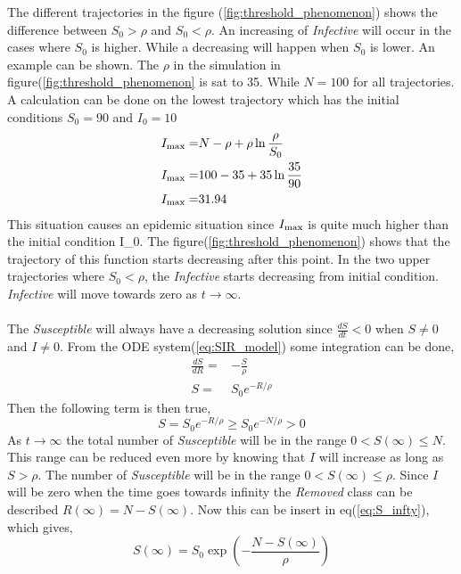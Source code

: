 \documentclass[%
twoside,                 %
final,                   %
10pt]{article}
\begin{document}
The different trajectories in the figure (\ref{fig:threshold_phenomenon}) shows the difference between $S_0 > \rho$ and $S_0< \rho$. An increasing of \emph{Infective} will occur in the cases where $S_0$ is higher. While a decreasing will happen when $S_0$ is lower. An example can be shown. The $\rho$ in the simulation in figure(\ref{fig:threshold_phenomenon} is sat to 35. While $N=100$ for all trajectories. A calculation can be done on the lowest trajectory which has the initial conditions $S_0= 90$ and $I_0= 10$
\begin{align*}
I_{\textrm{max}} =& N-\rho + \rho \ln \frac{\rho}{S_0}\\
I_{\textrm{max}} =& 100-35 + 35 \ln \frac{35}{90}\\
I_{\textrm{max}} =& 31.94
\end{align*}
This situation causes an epidemic situation since $I_{\textrm{max}}$ is quite much higher than the initial condition I_0. The figure(\ref{fig:threshold_phenomenon}) shows that the trajectory of this function starts decreasing after this point. In the two upper trajectories where $S_0< \rho$, the \emph{Infective} starts decreasing from initial condition. \emph{Infective} will move towards zero as $t\rightarrow \infty$.
\\
\\
The \emph{Susceptible} will always have a decreasing solution since $\frac{dS}{dt}<0$ when $S\neq0$ and $I\neq0$. From the ODE system(\ref{eq:SIR_model}) some integration can be done,
\begin{equation} \label{eq:S_infty}
	\begin{aligned}
	\frac{dS}{dR} =& -\frac{S}{\rho}\\
	S =& S_0e^{-R/\rho} 
	\end{aligned}
\end{equation}
Then the following term is then true,
\begin{equation} 
S = S_0e^{-R/\rho} \geq S_0e^{-N/\rho} > 0
\end{equation}
As $t\rightarrow \infty$ the total number of \emph{Susceptible} will be in the range $0< S(\infty)\leq N$. This range can be reduced even more by knowing that $I$ will increase as long as $S> \rho$. The number of \emph{Susceptible} will be in the range $0< S(\infty)\leq \rho$. Since $I$ will be zero when the time goes towards infinity the \emph{Removed} class can be described $R(\infty)= N -S(\infty)$. Now this can be insert in eq(\ref{eq:S_infty}), which gives,
\begin{equation}
S(\infty) = S_0 \exp\left(-\frac{N-S(\infty)}{\rho}\right)
\end{equation}
\end{document}
